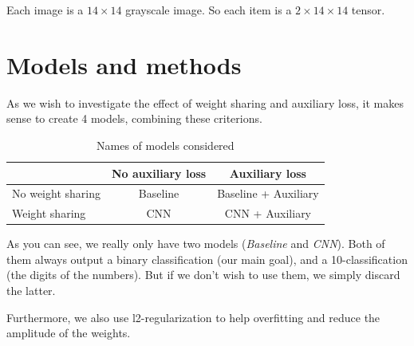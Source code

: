 \documentclass[10pt,conference]{IEEEtran}
\begin{document}
Each image is a $14\times14$ grayscale image. So each item is a $2\times14\times14$ tensor.


\section{Models and methods}
As we wish to investigate the effect of weight sharing and auxiliary loss, it makes sense to create 4 models, combining these criterions.
\begin{table}[h]
    \begin{tabular}{l|c|c}
        & No auxiliary loss & Auxiliary loss\\
        \hline
        No weight sharing & Baseline & Baseline + Auxiliary\\
        \hline
        Weight sharing & CNN & CNN + Auxiliary
    \end{tabular}
    \label{tab:names_models}
    \caption{Names of models considered}
\end{table}
As you can see, we really only have two models (\textit{Baseline} and \textit{CNN}). Both of them always output a binary classification (our main goal), and a 10-classification (the digits of the numbers). But if we don't wish to use them, we simply discard the latter.

Furthermore, we also use l2-regularization to help overfitting and reduce the amplitude of the weights.
\end{document}
